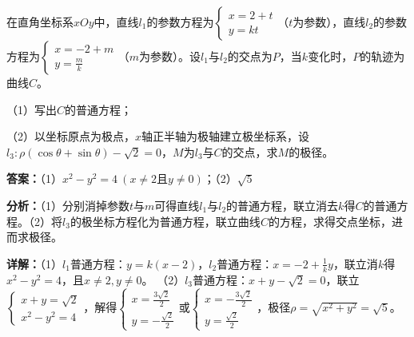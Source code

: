\begin{question}[points=10]
[选修4-4：坐标系与参数方程]

在直角坐标系$xOy$中，直线$l_1$的参数方程为$\begin{cases} x=2+t\\ y=kt \end{cases}$（$t$为参数），直线$l_2$的参数方程为$\begin{cases} x=-2+m\\ y=\frac{m}{k} \end{cases}$（$m$为参数）。设$l_1$与$l_2$的交点为$P$，当$k$变化时，$P$的轨迹为曲线$C$。

（1）写出$C$的普通方程；

（2）以坐标原点为极点，$x$轴正半轴为极轴建立极坐标系，设$l_3:\rho(\cos\theta+\sin\theta)-\sqrt{2}=0$，$M$为$l_3$与$C$的交点，求$M$的极径。
\begin{solution}
\textbf{答案：}（1）$x^2-y^2=4\ (x\neq 2且y\neq 0)$；（2）$\sqrt{5}$

\textbf{分析：}（1）分别消掉参数$t$与$m$可得直线$l_1$与$l_2$的普通方程，联立消去$k$得$C$的普通方程。（2）将$l_3$的极坐标方程化为普通方程，联立曲线$C$的方程，求得交点坐标，进而求极径。

\textbf{详解：}（1）$l_1$普通方程：$y=k(x-2)$，$l_2$普通方程：$x=-2+\frac{1}{k}y$，联立消$k$得$x^2-y^2=4$，且$x\neq 2,y\neq 0$。
（2）$l_3$普通方程：$x+y-\sqrt{2}=0$，联立$\begin{cases} x+y=\sqrt{2}\\ x^2-y^2=4 \end{cases}$，解得$\begin{cases} x=\frac{3\sqrt{2}}{2}\\ y=-\frac{\sqrt{2}}{2} \end{cases}$或$\begin{cases} x=-\frac{3\sqrt{2}}{2}\\ y=\frac{\sqrt{2}}{2} \end{cases}$，极径$\rho=\sqrt{x^2+y^2}=\sqrt{5}$。
\end{solution}
\end{question}

